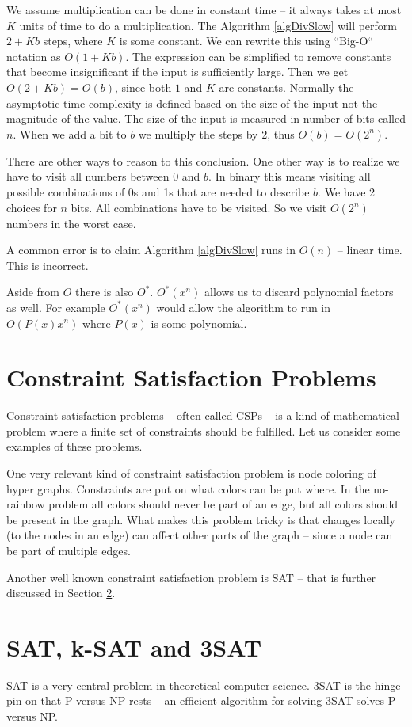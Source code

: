\documentclass[msc,lith,english]{liuthesis}
\begin{document}
We assume multiplication can be done in constant time -- it always takes at most $K$ units of time to do a multiplication.
The Algorithm \ref{algDivSlow} will perform $ 2 + Kb $ steps, where $K$ is some
constant. We can rewrite this using ``Big-O`` notation as $O(1 + Kb)$. The expression can be
simplified to remove constants that become insignificant if the
input is sufficiently large. Then we get $O(2 + Kb) = O(b)$, since both $1$ and $K$ are constants. 
Normally the asymptotic time complexity is defined based on the size of the input not the magnitude of the value.
The size of the input is measured in number of bits called $n$. When we add a bit to $b$ we multiply the steps by 2,
thus $O(b) = O(2^n)$.

There are other ways to reason to this conclusion.
One other way is to realize we have to visit all numbers between $0$ and $b$.
In binary this means visiting all possible combinations of 0s and 1s that are needed to describe $b$.
We have 2 choices for $n$ bits. All combinations have to be visited. So we visit $O(2^n)$ numbers in the worst case. 

A common error is to claim Algorithm \ref{algDivSlow} runs in $O(n)$ -- linear time. This is incorrect.

Aside from $O$ there is also $O^*$. $O^*(x^n)$ allows us to discard polynomial factors as well. For example $O^*(x^n)$ would allow the algorithm to run in $O(P(x)x^n)$ where $P(x)$ is some polynomial.

\section{Constraint Satisfaction Problems}
Constraint satisfaction problems -- often called CSPs -- is a kind of mathematical problem where a finite set of constraints should be fulfilled. Let us consider some examples of these problems.

One very relevant kind of constraint satisfaction problem is node coloring of hyper graphs.
Constraints are put on what colors can be put where. In the no-rainbow problem all colors should never be part of an edge, but all colors should be present in the graph. What makes this problem tricky is that changes locally (to the nodes in an edge) can affect other parts of the graph -- since a node can be part of multiple edges.

Another well known constraint satisfaction problem is SAT -- that is further discussed in Section \ref{secSAT}.

\section{SAT, k-SAT and 3SAT}\label{secSAT}
SAT is a very central problem in theoretical computer science. 3SAT is the
hinge pin on that P versus NP rests -- an efficient algorithm for solving 3SAT
solves P versus NP.
\end{document}
